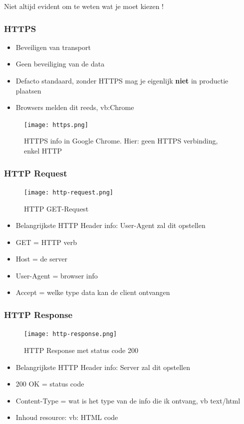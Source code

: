 \documentclass{article}
\newcommand{\bold}[1]{\textbf{#1}}
\begin{document}
Niet altijd evident om te weten wat je moet kiezen !

\subsubsection{HTTPS}

\begin{itemize}
    \item Beveiligen van transport
    \item Geen beveiliging van de data
    \item Defacto standaard, zonder HTTPS mag je eigenlijk \bold{niet} in productie plaatsen
    \item Browsers melden dit reeds, vb:Chrome
\end{itemize}

\begin{figure}[H]
    \centering
    \texttt{[image: https.png]}
    \caption{HTTPS info in Google Chrome. Hier: geen HTTPS verbinding, enkel HTTP}
\end{figure}

\subsubsection{HTTP Request}
\begin{figure}[H]
    \centering
    \texttt{[image: http-request.png]}
    \caption{HTTP GET-Request}
\end{figure}

\begin{itemize}
    \item Belangrijkste HTTP Header info: User-Agent zal dit opstellen
    \item GET = HTTP verb
    \item Host = de server
    \item User-Agent = browser info
    \item Accept = welke type data kan de client ontvangen
\end{itemize}

\subsubsection{HTTP Response}
\begin{figure}[H]
    \centering
    \texttt{[image: http-response.png]}
    \caption{HTTP Response met status code 200}
\end{figure}

\begin{itemize}
    \item Belangrijkste HTTP Header info: Server zal dit opstellen
    \item 200 OK = status code
    \item Content-Type = wat is het type van de info die ik ontvang, vb text/html
    \item Inhoud resource: vb: HTML code
\end{itemize}
\end{document}

